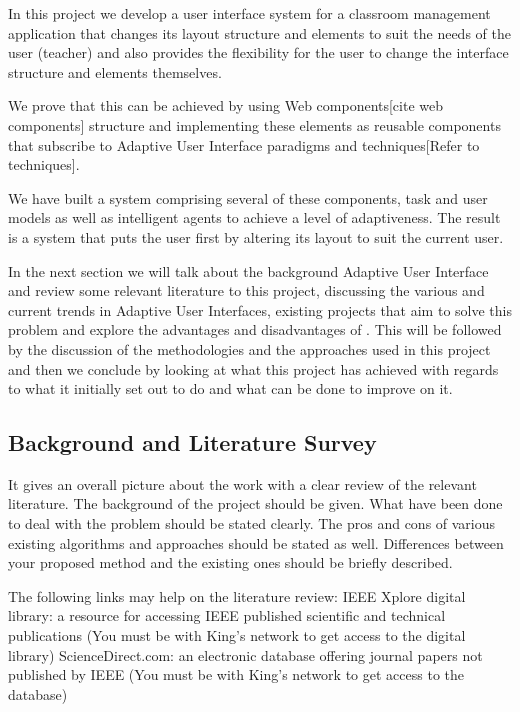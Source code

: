 In this project we develop a user interface system for a classroom management application that changes its layout structure and elements to suit the needs of the user (teacher) and also provides the flexibility for the user to change the interface structure and elements themselves.

We prove that this can be achieved by using Web components[cite web components] structure and implementing these elements as reusable components that subscribe to Adaptive User Interface paradigms and techniques[Refer to techniques].

We have built a system comprising several of these components, task and user models as well as intelligent agents to achieve a level of adaptiveness. The result is a system that puts the user first by altering its layout to suit the current user.

In the next section we will talk about the background Adaptive User Interface and review some relevant literature to this project, discussing the various and current trends in Adaptive User Interfaces, existing projects that aim to solve this problem and explore the advantages and disadvantages of . This will be followed by the discussion of the methodologies and the approaches used in this project and then we conclude by looking at what this project has achieved with regards to what it initially set out to do and what can be done to improve on it. 
\subsection{Background and Literature Survey} \label{sub:background}
 It gives an overall picture about the work with a clear review of the relevant literature.  The background of the project should be given.  What have been done to deal with the problem should be stated clearly.  The pros and cons of various existing algorithms and approaches should be stated as well.  Differences between your proposed method and the existing ones should be briefly described.

The following links may help on the literature review:
IEEE Xplore digital library: a resource for accessing IEEE published scientific and technical publications (You must be with King's network to get access to the digital library)
ScienceDirect.com: an electronic database offering journal papers not published by IEEE (You must be with King's network to get access to the database)
